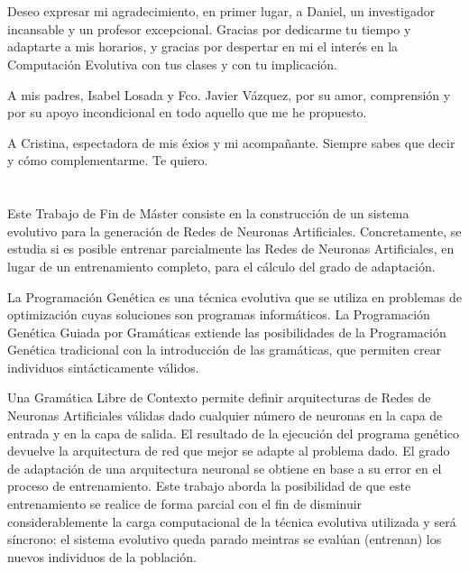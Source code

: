 \documentclass[spanish,a4paper,12pt,twoside]{report}
\begin{document}
  \chapter{\vspace{-3cm}{\LARGE Agradecimientos}}
  \vspace{-1cm}
    Deseo expresar mi agradecimiento, en primer lugar, a Daniel, un investigador incansable y un profesor excepcional. Gracias por dedicarme tu tiempo y adaptarte a mis horarios, y gracias por despertar en mi el interés en la Computación Evolutiva con tus clases y con tu implicación.\par
    A mis padres, Isabel Losada y Fco. Javier Vázquez, por su amor, comprensión y por su apoyo incondicional en todo aquello que me he propuesto.\par
    A Cristina, espectadora de mis éxios y mi acompañante. Siempre sabes que decir y cómo complementarme. Te quiero.
  \vfill
  \newpage\cleardoublepage
  
  \chapter{\vspace{-3cm}{\LARGE Resumen}}
  \vspace{-1cm}
  Este Trabajo de Fin de Máster consiste en la construcción de un sistema evolutivo para la generación de Redes de Neuronas Artificiales. Concretamente, se estudia si es posible entrenar parcialmente las Redes de Neuronas Artificiales, en lugar de un entrenamiento completo, para el cálculo del grado de adaptación. \par
  La Programación Genética es una técnica evolutiva que se utiliza en problemas de optimización cuyas soluciones son programas informáticos. La Programación Genética Guiada por Gramáticas extiende las posibilidades de la Programación Genética tradicional con la introducción de las gramáticas, que permiten crear individuos sintácticamente válidos. \par
  Una Gramática Libre de Contexto permite definir arquitecturas de Redes de Neuronas Artificiales válidas dado cualquier número de neuronas en la capa de entrada y en la capa de salida. El resultado de la ejecución del programa genético devuelve la arquitectura de red que mejor se adapte al problema dado. El grado de adaptación de una arquitectura neuronal se obtiene en base a su error en el proceso de entrenamiento. Este trabajo aborda la posibilidad de que este entrenamiento se realice de forma parcial con el fin de disminuir considerablemente la carga computacional de la técnica evolutiva utilizada y será síncrono: el sistema evolutivo queda parado meintras se evalúan (entrenan) los nuevos individuos de la población. \vfill
  \newpage\cleardoublepage
  
\end{document}
